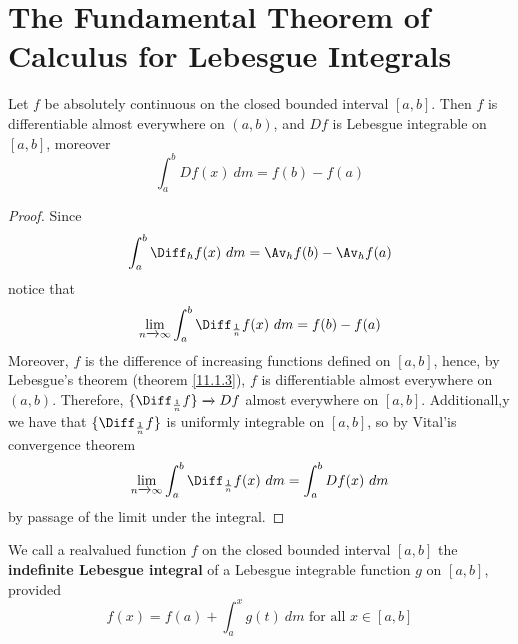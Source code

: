 \section{The Fundamental Theorem of Calculus for Lebesgue Integrals}

\begin{theorem}\label{11.4.1}
    Let $f$ be absolutely continuous on the closed bounded interval  $[a,b]$.
    Then $f$ is differentiable almost everywhere on  $(a,b)$, and $D{f}$ is
    Lebesgue integrable on $[a,b]$, moreover
    \begin{equation*}
        \int_a^b{D{f(x)} \ dm}=f(b)-f(a)
    \end{equation*}
\end{theorem}
\begin{proof}
    Since
    \begin{equation*}
        \int_a^b{\Diff_h{f(x)} \ dm}=\Av_h{f(b)}-\Av_h{f(a)}
    \end{equation*}
    notice that
    \begin{equation*}
        \lim_{n \xrightarrow{} \infty}{\int_a^b{\Diff_{\frac{1}{n}}{f(x)} \ dm}}=
        f(b)-f(a)
    \end{equation*}
    Moreover, $f$ is the difference of increasing functions defined on  $[a,b]$,
    hence, by Lebesgue's theorem (theorem \ref{11.1.3}), $f$ is differentiable
    almost everywhere on  $(a,b)$. Therefore, $\{\Diff_{\frac{1}{n}}{f}\}
    \xrightarrow{} D{f}$ almost everywhere on $[a,b]$. Additionall,y we have
    that $\{\Diff_{\frac{1}{n}}{f}\}$ is uniformly integrable on $[a,b]$, so by
     Vital'is convergence theorem
     \begin{equation*}
        \lim_{n \xrightarrow{} \infty}{\int_a^b{\Diff_{\frac{1}{n}}{f(x)} \ dm}}=
        \int_a^b{D{f(x)} \ dm}
     \end{equation*}
     by passage of the limit under the integral.
\end{proof}

\begin{definition}
    We call a realvalued function $f$ on the closed bounded interval $[a,b]$ the
    \textbf{indefinite Lebesgue integral} of a Lebesgue integrable function $g$
    on $[a,b]$, provided
    \begin{equation*}
        f(x)=f(a)+\int_a^x{g(t) \ dm} \text{ for all } x \in [a,b]
    \end{equation*}
\end{definition}

